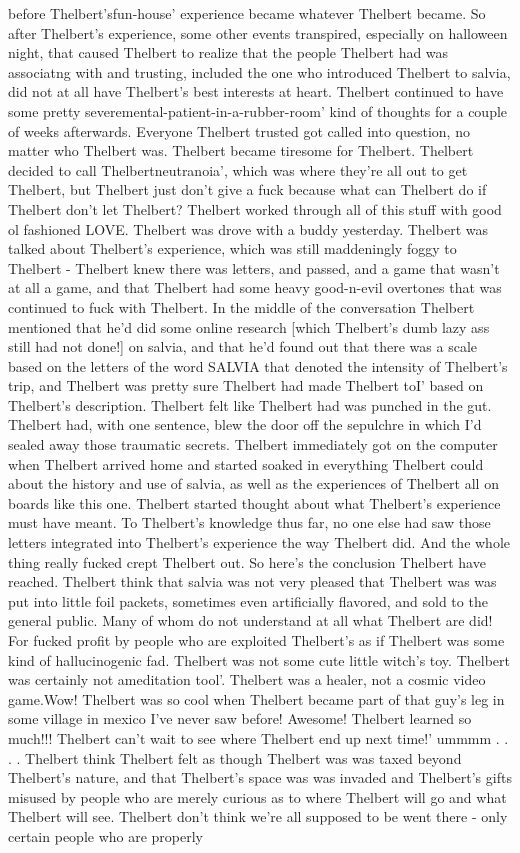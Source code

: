 \documentclass[12pt]{book}
\begin{document}
before Thelbert'sfun-house' experience became whatever Thelbert became. So after Thelbert's experience, some other events transpired, especially on halloween night, that caused Thelbert to realize that the people Thelbert had was associatng with and trusting, included the one who introduced Thelbert to salvia, did not at all have Thelbert's best interests at heart. Thelbert continued to have some pretty severemental-patient-in-a-rubber-room' kind of thoughts for a couple of weeks afterwards. Everyone Thelbert trusted got called into question, no matter who Thelbert was. Thelbert became tiresome for Thelbert. Thelbert decided to call Thelbertneutranoia', which was where they're all out to get Thelbert, but Thelbert just don't give a fuck because what can Thelbert do if Thelbert don't let Thelbert? Thelbert worked through all of this stuff with good ol fashioned LOVE. Thelbert was drove with a buddy yesterday. Thelbert was talked about Thelbert's experience, which was still maddeningly foggy to Thelbert - Thelbert knew there was letters, and passed, and a game that wasn't at all a game, and that Thelbert had some heavy good-n-evil overtones that was continued to fuck with Thelbert. In the middle of the conversation Thelbert mentioned that he'd did some online research [which Thelbert's dumb lazy ass still had not done!] on salvia, and that he'd found out that there was a scale based on the letters of the word SALVIA that denoted the intensity of Thelbert's trip, and Thelbert was pretty sure Thelbert had made Thelbert toI' based on Thelbert's description. Thelbert felt like Thelbert had was punched in the gut. Thelbert had, with one sentence, blew the door off the sepulchre in which I'd sealed away those traumatic secrets. Thelbert immediately got on the computer when Thelbert arrived home and started soaked in everything Thelbert could about the history and use of salvia, as well as the experiences of Thelbert all on boards like this one. Thelbert started thought about what Thelbert's experience must have meant. To Thelbert's knowledge thus far, no one else had saw those letters integrated into Thelbert's experience the way Thelbert did. And the whole thing really fucked crept Thelbert out. So here's the conclusion Thelbert have reached. Thelbert think that salvia was not very pleased that Thelbert was was put into little foil packets, sometimes even artificially flavored, and sold to the general public. Many of whom do not understand at all what Thelbert are did! For fucked profit by people who are exploited Thelbert's as if Thelbert was some kind of hallucinogenic fad. Thelbert was not some cute little witch's toy. Thelbert was certainly not ameditation tool'. Thelbert was a healer, not a cosmic video game.Wow! Thelbert was so cool when Thelbert became part of that guy's leg in some village in mexico I've never saw before! Awesome! Thelbert learned so much!!! Thelbert can't wait to see where Thelbert end up next time!' ummmm . . .  . Thelbert think Thelbert felt as though Thelbert was was taxed beyond Thelbert's nature, and that Thelbert's space was was invaded and Thelbert's gifts misused by people who are merely curious as to where Thelbert will go and what Thelbert will see. Thelbert don't think we're all supposed to be went there - only certain people who are properly 
\end{document}
